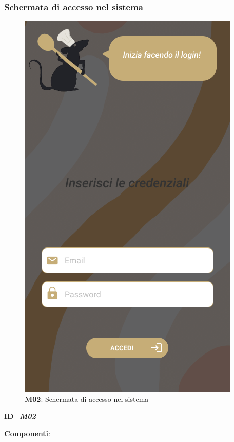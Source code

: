         \subsubsection{Schermata di accesso nel sistema}
            \begin{figure}[H]
                \centering
                \includegraphics[scale=0.5]{assets/Mockup/Mockup_Accesso.png}
                \caption{\textbf{M02}: Schermata di accesso nel sistema}\label{fig:Mockup_Login}
            \end{figure}
            \begin{flushleft}
                \textbf{ID} \ \Large{\textit{\textbf{M02}}}\\
            \end{flushleft}

            \textbf{Componenti}:

